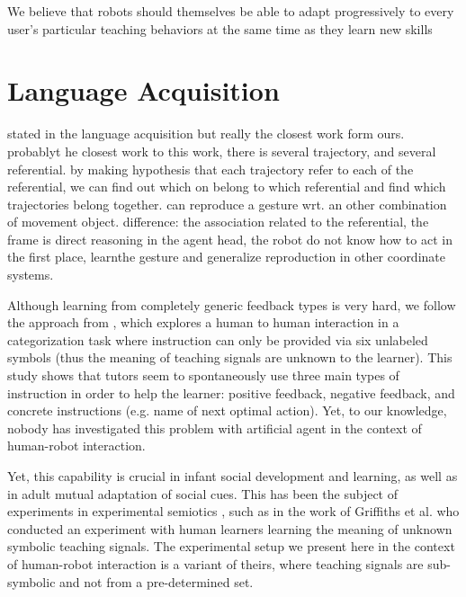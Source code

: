  We believe that robots should themselves be able to adapt progressively to every user's particular teaching behaviors at the same time as they learn new skills

\section{Language Acquisition}
\label{chapter:related:language}

stated in the language acquisition but really the closest work form ours.
\cite{cederborg2011imitating} probablyt he closest work to this work, there is several trajectory, and several referential. by making hypothesis that each trajectory refer to each of the referential, we can find out which on belong to which referential and find which trajectories belong together. can reproduce a gesture wrt. an other combination of movement object. 
difference: the association related to the referential, the frame is direct reasoning in the agent head, the robot do not know how to act in the first place, learnthe gesture and generalize reproduction in other coordinate systems.


Although learning from completely generic feedback types is very hard, we follow the approach from \cite{griffiths2012bottom}, which explores a human to human interaction in a categorization task where instruction can only be provided via six unlabeled symbols (thus the meaning of teaching signals are unknown to the learner). This study shows that tutors seem to spontaneously use three main types of instruction in order to help the learner: positive feedback, negative feedback, and concrete instructions (e.g. name of next optimal action). Yet, to our knowledge, nobody has investigated this problem with artificial agent in the context of human-robot interaction.


Yet, this capability is crucial in infant social development and learning, as well as in adult mutual adaptation of social cues. This has been the subject of experiments in experimental semiotics \cite{galantucci2009experimental}, such as in the work of Griffiths et al. \cite{griffiths2012bottom} who conducted an experiment with human learners learning the meaning of unknown symbolic teaching signals. The experimental setup we present here in the context of human-robot interaction is a variant of theirs, where teaching signals are sub-symbolic and not from a pre-determined set.

